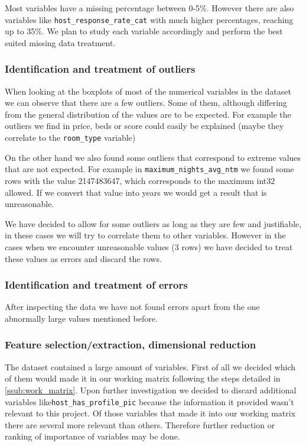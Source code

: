 Most variables have a missing percentage between 0-5\%. However there are also
variables like \texttt{host\_response\_rate\_cat} with much higher percentages,
reaching up to 35\%.  We plan to study each variable accordingly and perform the
best suited missing data treatment.

\subsubsection{Identification and treatment of outliers}

When looking at the boxplots of most of the numerical variables in the dataset
we can observe that there are a few outliers. Some of them, although differing
from the general distribution of the values are to be expected. For example the
outliers we find in price, beds or score could easily be explained (maybe they
correlate to the \texttt{room\_type} variable)

On the other hand we also found some outliers that correspond to extreme values
that are not expected. For example in \texttt{maximum\_nights\_avg\_ntm} we
found some rows with the value 2147483647, which corresponds to the maximum
int32 allowed. If we convert that value into years we would get a result that is
unreasonable.

We have decided to allow for some outliers as long as they are few and
justifiable, in these cases we will try to correlate them to other variables.
However in the cases when we encounter unreasonable values (3 rows) we have
decided to treat these values as errors and discard the rows.

\subsubsection{Identification and treatment of errors}

After inspecting the data we have not found errors apart from the one abnormally
large values mentioned before.

\subsubsection{Feature selection/extraction, dimensional reduction}

The \airbnb dataset contained a large amount of variables. First of all we
decided which of them would made it in our working matrix following the steps
detailed in \ref{ssub:work_matrix}. Upon further investigation we decided to
discard additional variables like\texttt{host\_has\_profile\_pic} because the
information it provided wasn't relevant to this project. Of those variables that
made it into our working matrix there are several more relevant than others.
Therefore further reduction or ranking of importance of variables may be done.

